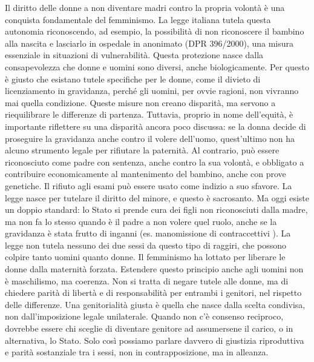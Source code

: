 \documentclass[12pt]{book} %
\begin{document}
\begin{mdframed}[linewidth=1pt]
Il diritto delle donne a non diventare madri contro la propria volontà è una conquista fondamentale del femminismo. La legge italiana tutela questa autonomia riconoscendo, ad esempio, la possibilità di non riconoscere il bambino alla nascita e lasciarlo in ospedale in anonimato (DPR 396/2000), una misura essenziale in situazioni di vulnerabilità.
Questa protezione nasce dalla consapevolezza che donne e uomini sono diversi, anche biologicamente. Per questo è giusto che esistano tutele specifiche per le donne, come il divieto di licenziamento in gravidanza, perché gli uomini, per ovvie ragioni, non vivranno mai quella condizione. Queste misure non creano disparità, ma servono a riequilibrare le differenze di partenza.
Tuttavia, proprio in nome dell’equità, è importante riflettere su una disparità ancora poco discussa: se la donna decide di proseguire la gravidanza anche contro il volere dell’uomo, quest’ultimo non ha alcuno strumento legale per rifiutare la paternità. Al contrario, può essere riconosciuto come padre con sentenza, anche contro la sua volontà, e obbligato a contribuire economicamente al mantenimento del bambino, anche con prove genetiche. Il rifiuto agli esami può essere usato come indizio a suo sfavore.
La legge nasce per tutelare il diritto del minore, e questo è sacrosanto. Ma oggi esiste un doppio standard: lo Stato si prende cura dei figli non riconosciuti dalla madre, ma non fa lo stesso quando è il padre a non volere quel ruolo, anche se la gravidanza è stata frutto di inganni (es. manomissione di contraccettivi ). La legge non tutela nessuno dei due sessi da questo tipo di raggiri, che possono colpire tanto uomini quanto donne.
Il femminismo ha lottato per liberare le donne dalla maternità forzata. Estendere questo principio anche agli uomini non è maschilismo, ma coerenza. Non si tratta di negare tutele alle donne, ma di chiedere parità di libertà e di responsabilità per entrambi i genitori, nel rispetto delle differenze.
Una genitorialità giusta è quella che nasce dalla scelta condivisa, non dall’imposizione legale unilaterale. Quando non c’è consenso reciproco, dovrebbe essere chi sceglie di diventare genitore ad assumersene il carico, o in alternativa, lo Stato. Solo così possiamo parlare davvero di giustizia riproduttiva e parità sostanziale tra i sessi, non in contrapposizione, ma in alleanza.
\end{mdframed}
\end{document}
